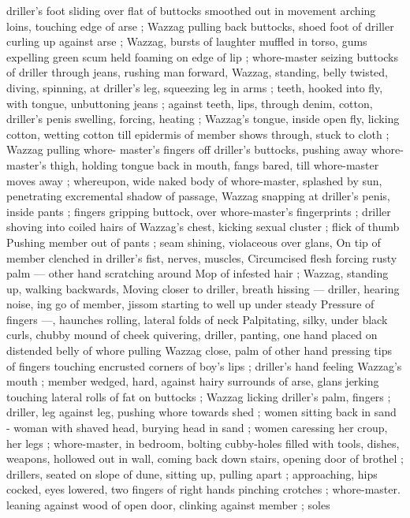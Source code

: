 driller's foot sliding over flat of buttocks smoothed out in movement
arching loins, touching edge of arse ; Wazzag pulling back buttocks,
shoed foot of driller curling up against arse ; Wazzag, bursts of
laughter muffled in torso, gums expelling green scum held foaming
on edge of lip ; whore-master seizing buttocks of driller through
jeans, rushing man forward, Wazzag, standing, belly twisted, diving,
spinning, at driller's leg, squeezing leg in arms ; teeth, hooked into
fly, with tongue, unbuttoning jeans ; against teeth, lips, through
denim, cotton, driller's penis swelling, forcing, heating ; Wazzag's
tongue, inside open fly, licking cotton, wetting cotton till epidermis
of member shows through, stuck to cloth ; Wazzag pulling whore-
master's fingers off driller's buttocks, pushing away whore-master's
thigh, holding tongue back in mouth, fangs bared, till whore-master
moves away ; whereupon, wide naked body of whore-master,
splashed by sun, penetrating excremental shadow of passage,
Wazzag snapping at driller's penis, inside pants ; fingers gripping
buttock, over whore-master’s fingerprints ; driller shoving into coiled
hairs of Wazzag's chest, kicking sexual cluster ; flick of thumb
Pushing member out of pants ; seam shining, violaceous over glans,
On tip of member clenched in driller's fist, nerves, muscles,
Circumcised flesh forcing rusty palm --- other hand scratching around
Mop of infested hair ; Wazzag, standing up, walking backwards,
Moving closer to driller, breath hissing --- driller, hearing noise,
ing go of member, jissom starting to well up under steady
Pressure of fingers ---, haunches rolling, lateral folds of neck
Palpitating, silky, under black curls, chubby mound of cheek
quivering, driller, panting, one hand placed on distended belly of
whore pulling Wazzag close, palm of other hand pressing tips of
fingers touching encrusted corners of boy's lips ; driller's hand
feeling Wazzag's mouth ; member wedged, hard, against hairy
surrounds of arse, glans jerking touching lateral rolls of fat on
buttocks ; Wazzag licking driller’s palm, fingers ; driller, leg against
leg, pushing whore towards shed ; women sitting back in sand -
woman with shaved head, burying head in sand ; women caressing
her croup, her legs ; whore-master, in bedroom, bolting cubby-holes
filled with tools, dishes, weapons, hollowed out in wall, coming back
down stairs, opening door of brothel ; drillers, seated on slope of
dune, sitting up, pulling apart ; approaching, hips cocked, eyes
lowered, two fingers of right hands pinching crotches ; whore-master.
leaning against wood of open door, clinking against member ; soles
